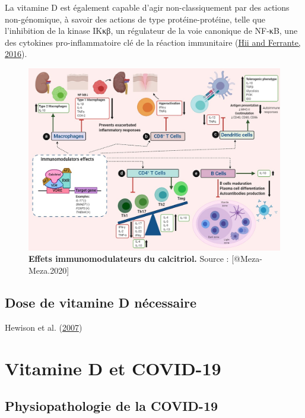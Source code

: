 \documentclass[
  a4paper,
  DIV=11,
  numbers=noendperiod,
  listof=totoc]{scrreprt}
\begin{document}
La vitamine D est également capable d'agir non-classiquement par des
actions non-génomique, à savoir des actions de type protéine-protéine,
telle que l'inhibition de la kinase IKκβ, un régulateur de la voie
canonique de NF-κB, une des cytokines pro-inflammatoire clé de la
réaction immunitaire (\protect\hyperlink{ref-Hii.2016}{Hii and Ferrante,
2016}).

\begin{figure}
\includegraphics{figures/calcitriol-immunomodulatory.jpg} 
\caption[\textbf{Effets immunomodulateurs du calcitriol.}]{\textbf{Effets immunomodulateurs du calcitriol.} Source : [@Meza-Meza.2020]}\label{fig:immunomod}
\end{figure}

\hypertarget{dose-de-vitamine-d-nuxe9cessaire}{%
\section{Dose de vitamine D
nécessaire}\label{dose-de-vitamine-d-nuxe9cessaire}}

Hewison et al. (\protect\hyperlink{ref-Hewison.2007}{2007})

\hypertarget{vitamine-d-et-covid-19}{%
\chapter{Vitamine D et COVID-19}\label{vitamine-d-et-covid-19}}

\hypertarget{physiopathologie-de-la-covid-19}{%
\section{Physiopathologie de la
COVID-19}\label{physiopathologie-de-la-covid-19}}
\end{document}
